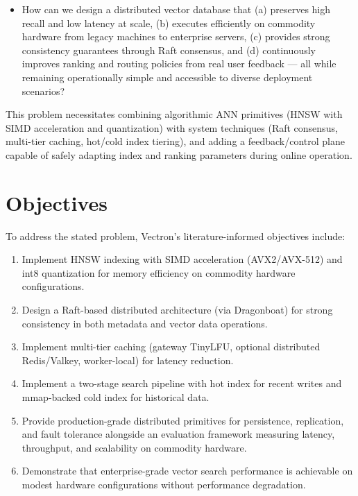 \begin{itemize}
    \item How can we design a distributed vector database that (a) preserves high recall and low latency at scale, (b) executes efficiently on commodity hardware from legacy machines to enterprise servers, (c) provides strong consistency guarantees through Raft consensus, and (d) continuously improves ranking and routing policies from real user feedback --- all while remaining operationally simple and accessible to diverse deployment scenarios?
\end{itemize}

This problem necessitates combining algorithmic ANN primitives (HNSW with SIMD acceleration and quantization) with system techniques (Raft consensus, multi-tier caching, hot/cold index tiering), and adding a feedback/control plane capable of safely adapting index and ranking parameters during online operation.

\section{Objectives}
To address the stated problem, Vectron's literature-informed objectives include:

\begin{enumerate}[label=\textbf{\arabic*.}]
    \item Implement HNSW indexing with SIMD acceleration (AVX2/AVX-512) and int8 quantization for memory efficiency on commodity hardware configurations.
    
    \item Design a Raft-based distributed architecture (via Dragonboat) for strong consistency in both metadata and vector data operations.
    
    \item Implement multi-tier caching (gateway TinyLFU, optional distributed Redis/Valkey, worker-local) for latency reduction.
    
    \item Implement a two-stage search pipeline with hot index for recent writes and mmap-backed cold index for historical data.
    
    \item Provide production-grade distributed primitives for persistence, replication, and fault tolerance alongside an evaluation framework measuring latency, throughput, and scalability on commodity hardware.
    
    \item Demonstrate that enterprise-grade vector search performance is achievable on modest hardware configurations without performance degradation.
\end{enumerate}

